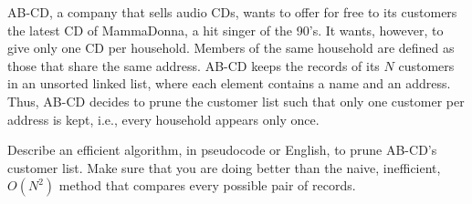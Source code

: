 AB-CD, a company that sells audio CDs, wants to offer for free to its
customers the latest CD of MammaDonna, a hit singer of the 90's. It
wants, however, to give only one CD per household.  Members of the same
household are defined as those that share the same address.  AB-CD
keeps the records of its $N$ customers in an unsorted linked list,
where each element contains a name and an address.  Thus, AB-CD decides
to prune the customer list such that only one customer per address is
kept, i.e., every household appears only once.

Describe an efficient algorithm, in pseudocode or English, to prune
AB-CD's customer list.  Make sure that you are doing better than the
naive, inefficient, $O(N^2)$ method that compares every possible pair
of records.
